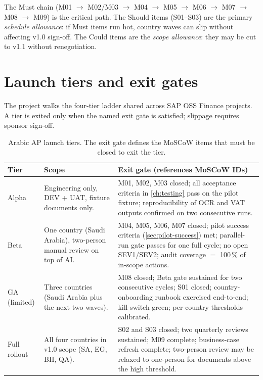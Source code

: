 \noindent
The Must chain (M01 $\to$ M02/M03 $\to$ M04 $\to$ M05 $\to$ M06 $\to$
M07 $\to$ M08 $\to$ M09) is the critical path. The Should items
(S01--S03) are the primary \emph{schedule allowance}: if Must items
run hot, country waves can slip without affecting v1.0 sign-off. The
Could items are the \emph{scope allowance}: they may be cut to v1.1
without renegotiation.

\section{Launch tiers and exit gates}\label{sec:ap-launch-tiers}

The project walks the four-tier ladder shared across SAP OSS Finance
projects. A tier is exited only when the named exit gate is satisfied;
slippage requires sponsor sign-off.

\begin{table}[htbp]
\centering
\caption{Arabic AP launch tiers. The exit gate defines the MoSCoW
items that must be closed to exit the tier.}
\label{tab:ap-launch-tiers}
\footnotesize
\begin{tabularx}{\linewidth}{@{}l l X@{}}
\toprule
\textbf{Tier} & \textbf{Scope} & \textbf{Exit gate (references MoSCoW IDs)} \\ \midrule
Alpha & Engineering only, DEV + UAT, fixture documents only. & M01, M02, M03 closed; all acceptance criteria in \cref{ch:testing} pass on the pilot fixture; reproducibility of OCR and VAT outputs confirmed on two consecutive runs. \\
Beta  & One country (Saudi Arabia), two-person manual review on top of AI. & M04, M05, M06, M07 closed; pilot success criteria (\cref{sec:pilot-success}) met; parallel-run gate passes for one full cycle; no open SEV1/SEV2; audit coverage $=$ 100\,\% of in-scope actions. \\
GA (limited) & Three countries (Saudi Arabia plus the next two waves). & M08 closed; Beta gate sustained for two consecutive cycles; S01 closed; country-onboarding runbook exercised end-to-end; kill-switch green; per-country thresholds calibrated. \\
Full rollout & All four countries in v1.0 scope (SA, EG, BH, QA). & S02 and S03 closed; two quarterly reviews sustained; M09 complete; business-case refresh complete; two-person review may be relaxed to one-person for documents above the high threshold. \\
\bottomrule
\end{tabularx}
\end{table}

